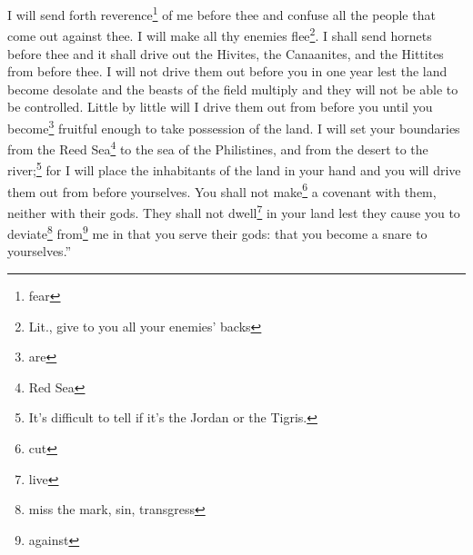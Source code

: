 \begin{enumerate}[align=center]
     I will send forth reverence\footnote{fear} of me before thee and confuse all the people that come out against thee. I will make all thy enemies flee\footnote{Lit., give to you all your enemies' backs}.%
     I shall send hornets before thee and it shall drive out the Hivites, the Canaanites, and the Hittites from before thee.%
     I will not drive them out before you in one year lest the land become desolate and the beasts of the field multiply and they will not be able to be controlled.%
     Little by little will I drive them out from before you until you become\footnote{are} fruitful enough to take possession of the land.%
     I will set your boundaries from the Reed Sea\footnote{Red Sea} to the sea of the Philistines, and from the desert to the river;\footnote{It's difficult to tell if it's the Jordan or the Tigris.} for I will place the inhabitants of the land in your hand and you will drive them out from before yourselves.%
     You shall not make\footnote{cut} a covenant with them, neither with their gods.%
     They shall not dwell\footnote{live} in your land lest they cause you to deviate\footnote{miss the mark, sin, transgress} from\footnote{against} me in that you serve their gods: that you become a snare to yourselves.''%
\end{enumerate}
